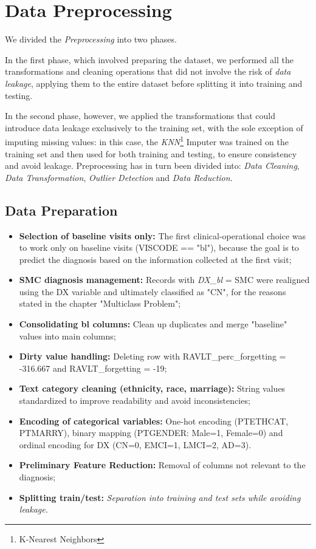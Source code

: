 \section{Data Preprocessing}
We divided the \textit{Preprocessing} into two phases. 

In the first phase, which involved preparing the dataset, we performed all the transformations and cleaning operations that did not involve the risk of \textit{data leakage}, applying them to the entire dataset before splitting it into training and testing. 

In the second phase, however, we applied the transformations that could introduce data leakage exclusively to the training set, with the sole exception of imputing missing values: in this case, the \textit{KNN}\footnote{K-Nearest Neighbors} Imputer was trained on the training set and then used for both training and testing, to ensure consistency and avoid leakage. Preprocessing has in turn been divided into: \textit{Data Cleaning}, \textit{Data Transformation}, \textit{Outlier Detection} and \textit{Data Reduction}. 

\subsection{Data Preparation}
\begin{itemize}
	\item \textbf{Selection of baseline visits only:} The first clinical-operational choice was to work only on baseline visits (VISCODE == "bl"), because the goal is to predict the diagnosis based on the information collected at the first visit; 
	\item \textbf{SMC diagnosis management:} Records with \textit{DX\_bl} = SMC were realigned using the DX variable and ultimately classified as "CN", for the reasons stated in the chapter "Multiclass Problem"; 
	\item \textbf{Consolidating bl columns:} Clean up duplicates and merge "baseline" values into main columns;
	\item \textbf{Dirty value handling:} Deleting row with RAVLT\_perc\_forgetting = -316.667 and RAVLT\_forgetting = -19;
	\item \textbf{Text category cleaning (ethnicity, race, marriage):} String values standardized to improve readability and avoid inconsistencies;
	\item \textbf{Encoding of categorical variables:} One-hot encoding (PTETHCAT, PTMARRY), binary mapping (PTGENDER: Male=1, Female=0) and ordinal encoding for DX (CN=0, EMCI=1, LMCI=2, AD=3).
	\item \textbf{Preliminary Feature Reduction:} Removal of columns not relevant to the diagnosis;
	\item \textbf{Splitting train/test:} \textit{Separation into training and test sets while avoiding leakage.}
\end{itemize}

